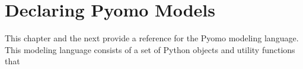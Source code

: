 \chapter{Declaring Pyomo Models}

This chapter and the next provide a reference for the Pyomo modeling language.
This modeling language consists of a set of Python objects and utility
functions that 













